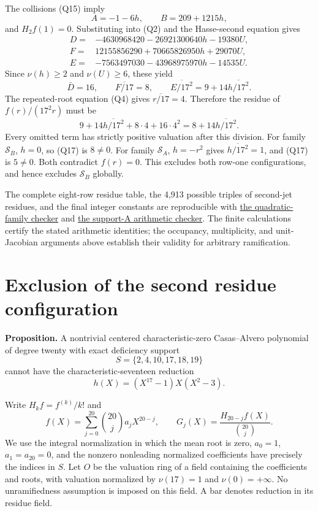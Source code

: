 \documentclass[
  british,
  10pt,
  a4paper,
]{article}
\begin{document}
The collisions (Q15) imply \[
A=-1-6h,\qquad B=209+1215h,
\] and \(H_2f(1)=0\). Substituting into (Q2) and the Hasse-second
equation gives \[
\begin{aligned}
D={}&-4630968420-26921300640h-19380U,\\
F={}&12155856290+70665826950h+29070U,\\
E={}&-7563497030-43968975970h-14535U.
\end{aligned} \tag{Q16}
\] Since \(\nu(h)\geq2\) and \(\nu(U)\geq6\), these yield \[
\bar D=16,\qquad \overline{F/17}=8,\qquad
\overline{E/17^2}=9+14\overline{h/17^2}.
\] The repeated-root equation (Q4) gives \(\overline{r/17}=4\).
Therefore the residue of \(f(r)/(17^2r)\) must be \[
9+14\overline{h/17^2}+8\cdot4+16\cdot4^2
=8+14\overline{h/17^2}. \tag{Q17}
\] Every omitted term has strictly positive valuation after this
division. For family \(\mathcal S_B\), \(h=0\), so (Q17) is \(8\ne0\).
For family \(\mathcal S_A\), \(h=-r^2\) gives \(\overline{h/17^2}=1\),
and (Q17) is \(5\ne0\). Both contradict \(f(r)=0\). This excludes both
row-one configurations, and hence excludes \(\mathcal S_B\) globally.

The complete eight-row residue table, the 4,913 possible triples of
second-jet residues, and the final integer constants are reproducible
with \href{research/next-stage/last-four/quadratic/B/check_B.py}{the
quadratic-family checker} and
\href{research/next-stage/last-four/quadratic/A/check_arithmetic.py}{the
support-A arithmetic checker}. The finite calculations certify the
stated arithmetic identities; the occupancy, multiplicity, and
unit-Jacobian arguments above establish their validity for arbitrary
ramification.

\section{Exclusion of the second residue
configuration}\label{exclusion-of-the-second-residue-configuration}

\textbf{Proposition.} A nontrivial centered characteristic-zero
Casas--Alvero polynomial of degree twenty with exact deficiency support
\[
S=\{2,4,10,17,18,19\}
\] cannot have the characteristic-seventeen reduction \[
h(X)=(X^{17}-1)X(X^2-3).
\]

Write \(H_kf=f^{(k)}/k!\) and \[
f(X)=\sum_{j=0}^{20}\binom{20}{j}a_jX^{20-j},
\qquad
G_j(X)=\frac{H_{20-j}f(X)}{\binom{20}{j}}.
\] We use the integral normalization in which the mean root is zero,
\(a_0=1\), \(a_1=a_{20}=0\), and the nonzero nonleading normalized
coefficients have precisely the indices in \(S\). Let \(O\) be the
valuation ring of a field containing the coefficients and roots, with
valuation normalized by \(\nu(17)=1\) and \(\nu(0)=+\infty\). No
unramifiedness assumption is imposed on this field. A bar denotes
reduction in its residue field.
\end{document}
